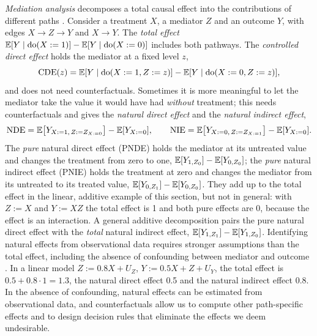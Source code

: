 \emph{Mediation analysis} decomposes a total causal effect into the contributions of different
paths \citep{pearl2001direct}. Consider a treatment $X$, a mediator $Z$ and an outcome $Y$, with
edges $X\rightarrow Z\rightarrow Y$ and $X\rightarrow Y$. The \emph{total effect}
$\mathbb{E}[Y\mid\mathrm{do}(X:=1)]-\mathbb{E}[Y\mid\mathrm{do}(X:=0)]$ includes both pathways. The \emph{controlled
direct effect} holds the mediator at a fixed level $z$,
\begin{equation}
  \mathrm{CDE}(z)=\mathbb{E}[Y\mid\mathrm{do}(X:=1,Z:=z)]-\mathbb{E}[Y\mid\mathrm{do}(X:=0,Z:=z)],
\end{equation}
and does not need counterfactuals. Sometimes it is more meaningful to let the mediator take the
value it would have had \emph{without} treatment; this needs counterfactuals and gives the
\emph{natural direct effect} and the \emph{natural indirect effect},
\begin{equation}
  \mathrm{NDE}=\mathbb{E}\bigl[Y_{X:=1,\,Z:=Z_{X:=0}}\bigr]-\mathbb{E}[Y_{X:=0}],\qquad
  \mathrm{NIE}=\mathbb{E}\bigl[Y_{X:=0,\,Z:=Z_{X:=1}}\bigr]-\mathbb{E}[Y_{X:=0}].
\end{equation}
The \emph{pure} natural direct effect (PNDE) holds the mediator at its untreated value and changes
the treatment from zero to one, $\mathbb{E}[Y_{1,Z_0}]-\mathbb{E}[Y_{0,Z_0}]$; the \emph{pure} natural indirect effect (PNIE)
holds the treatment at zero and changes the mediator from its untreated to its treated value,
$\mathbb{E}[Y_{0,Z_1}]-\mathbb{E}[Y_{0,Z_0}]$. They add up to the total effect in the linear,
additive example of this section, but not in general: with $Z:=X$ and $Y:=XZ$ the total effect is 1 and
both pure effects are 0, because the effect is an interaction. A general additive decomposition pairs
the pure natural direct effect with the \emph{total} natural indirect effect,
$\mathbb{E}[Y_{1,Z_1}]-\mathbb{E}[Y_{1,Z_0}]$. Identifying natural effects from observational data requires stronger
assumptions than the total effect, including the absence of confounding between mediator and outcome
\citep{pearl2001direct}.
In a linear model $Z:=0.8X+U_Z$, $Y:=0.5X+Z+U_Y$, the total effect is $0.5+0.8\cdot1=1.3$, the
natural direct effect 0.5 and the natural indirect effect 0.8. In the absence of confounding,
natural effects can be estimated from observational data, and counterfactuals allow us to compute
other path-specific effects and to design decision rules that eliminate the effects we deem
undesirable.

